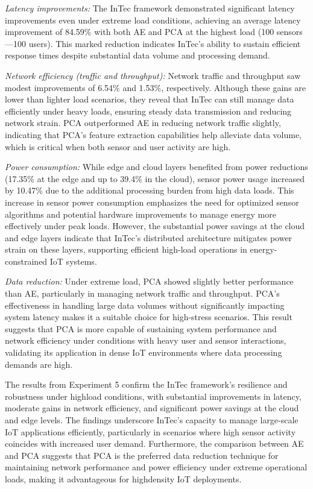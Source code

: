 \documentclass[11pt]{article}
\begin{document}
	\textit{Latency improvements:} The InTec framework demonstrated significant latency
	improvements even under extreme load conditions, achieving an average latency
	improvement of 84.59\% with both AE and PCA at the highest load (100 sensors—100 users). This marked reduction indicates InTec’s ability to sustain efficient
	response times despite substantial data volume and processing demand.
	
	\textit{Network efficiency (traffic and throughput):} Network traffic and throughput saw
	modest improvements of 6.54\% and 1.53\%, respectively. Although these gains are
	lower than lighter load scenarios, they reveal that InTec can still manage data efficiently under heavy loads, ensuring steady data transmission and reducing network
	strain. PCA outperformed AE in reducing network traffic slightly, indicating that
	PCA’s feature extraction capabilities help alleviate data volume, which is critical
	when both sensor and user activity are high.
	
	\textit{Power consumption:} While edge and cloud layers benefited from power reductions (17.35\% at the edge and up to 39.4\% in the cloud), sensor power usage
	increased by 10.47\% due to the additional processing burden from high data loads.
	This increase in sensor power consumption emphasizes the need for optimized sensor algorithms and potential hardware improvements to manage energy more effectively under peak loads. However, the substantial power savings at the cloud and
	edge layers indicate that InTec’s distributed architecture mitigates power strain on
	these layers, supporting efficient high-load operations in energy-constrained IoT
	systems.
	
	\textit{Data reduction:} Under extreme load, PCA showed slightly better performance
	than AE, particularly in managing network traffic and throughput. PCA’s effectiveness in handling large data volumes without significantly impacting system latency
	makes it a suitable choice for high-stress scenarios. This result suggests that PCA is
	more capable of sustaining system performance and network efficiency under conditions with heavy user and sensor interactions, validating its application in dense IoT
	environments where data processing demands are high.
	
	The results from
	Experiment 5 confirm the InTec framework’s resilience and robustness under highload conditions, with substantial improvements in latency, moderate gains in network efficiency, and significant power savings at the cloud and edge levels. The findings underscore InTec’s capacity to manage large-scale IoT applications efficiently,
	particularly in scenarios where high sensor activity coincides with increased user
	demand. Furthermore, the comparison between AE and PCA suggests that PCA is
	the preferred data reduction technique for maintaining network performance and
	power efficiency under extreme operational loads, making it advantageous for highdensity IoT deployments.
	
\end{document}

